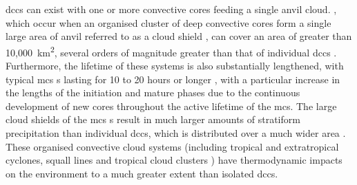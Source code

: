 \acrshort{dcc}s can exist with one or more convective cores feeding a single anvil cloud.
, which occur when an organised cluster of deep convective cores form a single large area of anvil referred to as a cloud shield \citep{roca_simple_2017}, can cover an area of greater than 10,000~km\textsuperscript{2}, several orders of magnitude greater than that of individual \acrshort{dcc}s \citep{houze_mesoscale_2004}.
Furthermore, the lifetime of these systems is also substantially lengthened, with typical \acrshort{mcs} s lasting for 10 to 20 hours or longer \citep{chen_diurnal_1997}, with a particular increase in the lengths of the initiation and mature phases \citep{wall_life_2018} due to the continuous development of new cores throughout the active lifetime of the \acrshort{mcs}.
The large cloud shields of the \acrshort{mcs} s result in much larger amounts of stratiform precipitation than individual \acrshort{dcc}s, which is distributed over a much wider area \citep{houze_chapter_2014}.
These organised convective cloud systems (including tropical and extratropical cyclones, squall lines and tropical cloud clusters \citep{tsakraklides_global_2003a}) have thermodynamic impacts on the environment to a much greater extent than isolated \acrshort{dcc}s.

